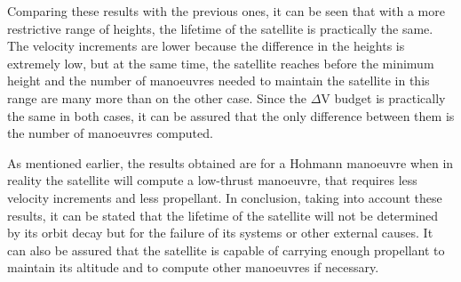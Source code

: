 Comparing these results with the previous ones, it can be seen that with a more restrictive range of heights, the lifetime of the satellite is practically the same. The velocity increments are lower because the difference in the heights is extremely low, but at the same time, the satellite reaches before the minimum height and the number of manoeuvres needed to maintain the satellite in this range are many more than on the other case. Since the $\Delta$V budget is practically the same in both cases, it can be assured that the only difference between them is the number of manoeuvres computed.

As mentioned earlier, the results obtained are for a Hohmann manoeuvre when in reality the satellite will compute a low-thrust manoeuvre, that requires less velocity increments and less propellant. In conclusion, taking into account these results, it can be stated that the lifetime of the satellite will not be determined by its orbit decay but for the failure of its systems or other external causes. It can also be assured that the satellite is capable of carrying enough propellant to maintain its altitude and to compute other manoeuvres if necessary.